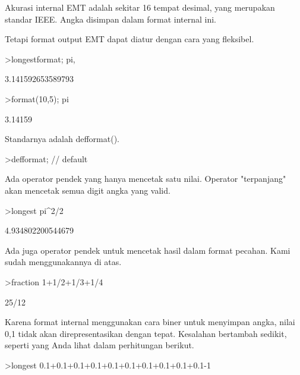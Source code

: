 \documentclass[a4paper,10pt]{article}
\begin{document}
\begin{eulernotebook}
\begin{eulercomment}
Akurasi internal EMT adalah sekitar 16 tempat desimal, yang merupakan
standar IEEE. Angka disimpan dalam format internal ini.

Tetapi format output EMT dapat diatur dengan cara yang fleksibel.
\end{eulercomment}
\begin{eulerprompt}
>longestformat; pi,
\end{eulerprompt}
\begin{euleroutput}
  3.141592653589793
\end{euleroutput}
\begin{eulerprompt}
>format(10,5); pi
\end{eulerprompt}
\begin{euleroutput}
    3.14159 
\end{euleroutput}
\begin{eulercomment}
Standarnya adalah defformat().
\end{eulercomment}
\begin{eulerprompt}
>defformat; // default
\end{eulerprompt}
\begin{eulercomment}
Ada operator pendek yang hanya mencetak satu nilai. Operator
"terpanjang" akan mencetak semua digit angka yang valid.
\end{eulercomment}
\begin{eulerprompt}
>longest pi^2/2
\end{eulerprompt}
\begin{euleroutput}
        4.934802200544679 
\end{euleroutput}
\begin{eulercomment}
Ada juga operator pendek untuk mencetak hasil dalam format pecahan.
Kami sudah menggunakannya di atas.
\end{eulercomment}
\begin{eulerprompt}
>fraction 1+1/2+1/3+1/4
\end{eulerprompt}
\begin{euleroutput}
  25/12
\end{euleroutput}
\begin{eulercomment}
Karena format internal menggunakan cara biner untuk menyimpan angka,
nilai 0,1 tidak akan direpresentasikan dengan tepat. Kesalahan
bertambah sedikit, seperti yang Anda lihat dalam perhitungan berikut.
\end{eulercomment}
\begin{eulerprompt}
>longest 0.1+0.1+0.1+0.1+0.1+0.1+0.1+0.1+0.1+0.1-1
\end{eulerprompt}

\end{eulernotebook}
\end{document}
